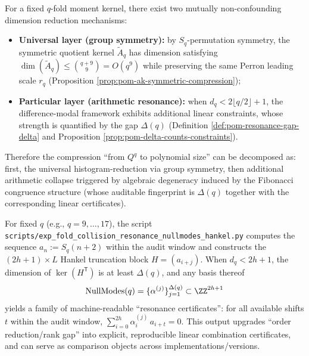 \begin{remark}\label{rem:pom-two-layer-dim-reduction}
For a fixed \(q\)-fold moment kernel, there exist two mutually non-confounding dimension reduction mechanisms:
\begin{itemize}
  \item \textbf{Universal layer (group symmetry):} by \(S_q\)-permutation symmetry, the symmetric quotient kernel \(\widetilde A_q\) has dimension satisfying
  \(
  \dim(\widetilde A_q)\le \binom{q+9}{9}=O(q^9)
  \)
  while preserving the same Perron leading scale \(r_q\) (Proposition \ref{prop:pom-ak-symmetric-compression});
  \item \textbf{Particular layer (arithmetic resonance):} when \(d_q<2\lfloor q/2\rfloor+1\), the difference-modal framework exhibits additional linear constraints, whose strength is quantified by the gap \(\Delta(q)\) (Definition \ref{def:pom-resonance-gap-delta} and Proposition \ref{prop:pom-delta-counts-constraints}).
\end{itemize}
Therefore the compression ``from \(Q^q\) to polynomial size'' can be decomposed as: first, the universal histogram-reduction via group symmetry, then additional arithmetic collapse triggered by algebraic degeneracy induced by the Fibonacci congruence structure (whose auditable fingerprint is \(\Delta(q)\) together with the corresponding linear certificates).
\end{remark}

\begin{remark}\label{rem:pom-nullmodes-algorithm}
For fixed \(q\) (e.g., \(q=9,\dots,17\)), the script \texttt{scripts/exp\_fold\_collision\_resonance\_nullmodes\_hankel.py} computes the sequence \(a_n:=S_q(n+2)\) within the audit window and constructs the \((2h+1)\times L\) Hankel truncation block \(H=(a_{i+j})\).
When \(d_q<2h+1\), the dimension of \(\ker(H^{\mathsf T})\) is at least \(\Delta(q)\), and any basis thereof
\[
\mathrm{NullModes}(q)=\{\alpha^{(j)}\}_{j=1}^{\Delta(q)}\subset\ZZ^{2h+1}
\]
yields a family of machine-readable ``resonance certificates'': for all available shifts \(t\) within the audit window,
\(
\sum_{i=0}^{2h}\alpha^{(j)}_i\,a_{i+t}=0
\).
This output upgrades ``order reduction/rank gap'' into explicit, reproducible linear combination certificates, and can serve as comparison objects across implementations/versions.
\end{remark}

